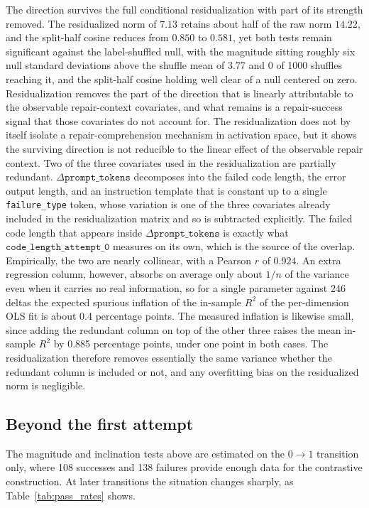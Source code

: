 The direction survives the full conditional residualization with part of its strength removed. 
The residualized norm of $7.13$ retains about half of the raw norm $14.22$, and the split-half cosine reduces from $0.850$ to $0.581$, yet both tests remain significant against the label-shuffled null, with the magnitude sitting roughly six null standard deviations above the shuffle mean of $3.77$ and 0 of 1000 shuffles reaching it, and the split-half cosine holding well clear of a null centered on zero.
Residualization removes the part of the direction that is linearly attributable to the observable repair-context covariates, and what remains is a repair-success signal that those covariates do not account for.
The residualization does not by itself isolate a repair-comprehension mechanism in activation space, but it shows the surviving direction is not reducible to the linear effect of the observable repair context.
Two of the three covariates used in the residualization are partially redundant. $\Delta\texttt{prompt\_tokens}$ decomposes into the failed code length, the error output length, and an instruction template that is constant up to a single \texttt{failure\_type} token, whose variation is one of the three covariates already included in the residualization matrix and so is subtracted explicitly. The failed code length that appears inside $\Delta\texttt{prompt\_tokens}$ is exactly what $\texttt{code\_length\_attempt\_0}$ measures on its own, which is the source of the overlap.
Empirically, the two are nearly collinear, with a Pearson $r$ of $0.924$. An extra regression column, however, absorbs on average only about $1/n$ of the variance even when it carries no real information, so for a single parameter against 246 deltas the expected spurious inflation of the in-sample $R^2$ of the per-dimension OLS fit is about 0.4 percentage points.
The measured inflation is likewise small, since adding the redundant column on top of the other three raises the mean in-sample $R^2$ by 0.885 percentage points, under one point in both cases. The residualization therefore removes essentially the same variance whether the redundant column is included or not, and any overfitting bias on the residualized norm is negligible.

\subsection{Beyond the first attempt}

The magnitude and inclination tests above are estimated on the $0 \to 1$ transition only, where 108 successes and 138 failures provide enough data for the contrastive construction. At later transitions the situation changes sharply, as Table~\ref{tab:pass_rates} shows.

